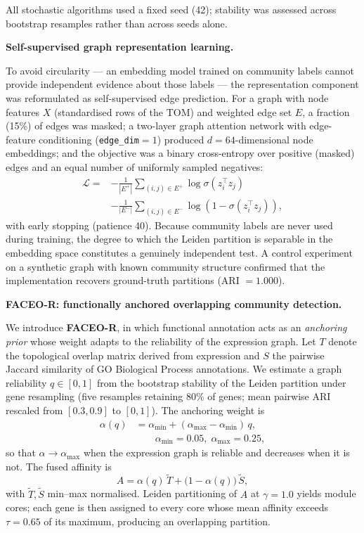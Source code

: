 \documentclass[twocolumn,10pt,a4paper]{article}
\begin{document}
All stochastic algorithms used a fixed seed (42); stability was assessed across bootstrap
resamples rather than across seeds alone.

\noindent\textbf{Self-supervised graph representation learning.} \label{sec:selfsup}

To avoid circularity --- an embedding model trained on community labels cannot provide
independent evidence about those labels --- the representation component was reformulated
as self-supervised edge prediction. For a graph with node features $X$ (standardised rows of
the TOM) and weighted edge set $E$, a fraction (15\%) of edges was masked; a two-layer
graph attention network with edge-feature conditioning (\texttt{edge\_dim}$=1$) produced
$d = 64$-dimensional node embeddings; and the objective was a binary cross-entropy over
positive (masked) edges and an equal number of uniformly sampled negatives:
\begin{equation}
\begin{split}
\mathcal{L} ={} &-\frac{1}{|E^{+}|}\sum_{(i,j)\in E^{+}}\log\sigma(z_i^{\top}z_j) \\
&-\frac{1}{|E^{-}|}\sum_{(i,j)\in E^{-}}\log\!\left(1-\sigma(z_i^{\top}z_j)\right),
\end{split}
\end{equation}
with early stopping (patience 40). Because community labels are never used during training,
the degree to which the Leiden partition is separable in the embedding space constitutes a
genuinely independent test. A control experiment on a synthetic graph with known community
structure confirmed that the implementation recovers ground-truth partitions (ARI $=1.000$).

\noindent\textbf{FACEO-R: functionally anchored overlapping community detection.} \label{sec:faceor}

We introduce \textbf{FACEO-R}, in which functional annotation acts as an \emph{anchoring
prior} whose weight adapts to the reliability of the expression graph. Let $T$ denote the
topological overlap matrix derived from expression and $S$ the pairwise Jaccard similarity
of GO Biological Process annotations. We estimate a graph reliability $q\in[0,1]$ from the
bootstrap stability of the Leiden partition under gene resampling (five resamples retaining
80\% of genes; mean pairwise ARI rescaled from $[0.3,0.9]$ to $[0,1]$). The anchoring weight
is
\begin{equation}
\begin{split}
\alpha(q) &= \alpha_{\min} + (\alpha_{\max}-\alpha_{\min})\,q, \\
&\qquad \alpha_{\min}=0.05,\;\alpha_{\max}=0.25,
\end{split}
\end{equation}
so that $\alpha\to\alpha_{\max}$ when the expression graph is reliable and decreases when
it is not. The fused affinity is
\begin{equation}
A = \alpha(q)\,\tilde{T} + \bigl(1-\alpha(q)\bigr)\,\tilde{S},
\end{equation}
with $\tilde{T},\tilde{S}$ min--max normalised. Leiden partitioning of $A$ at
$\gamma=1.0$ yields module cores; each gene is then assigned to every core whose mean
affinity exceeds $\tau=0.65$ of its maximum, producing an overlapping partition.
\end{document}
